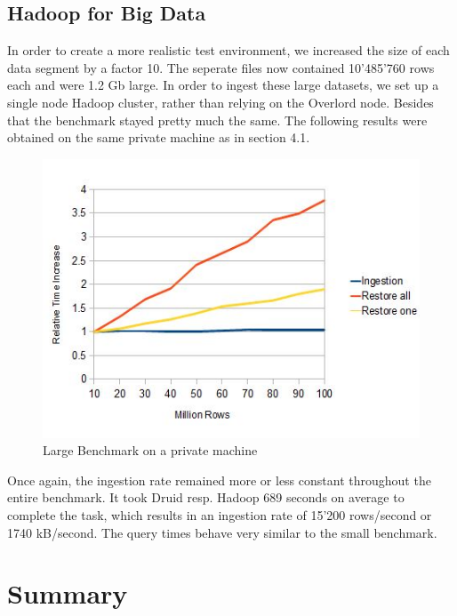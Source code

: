 \documentclass[11pt,singlecolumn]{scrartcl}
\begin{document}
\clearpage
\subsection{Hadoop for Big Data}
In order to create a more realistic test environment, we increased the size of each data segment by a factor 10. The seperate files now contained 10'485'760 rows each and were 1.2 Gb large. In order to ingest these large datasets, we set up a single node Hadoop cluster, rather than relying on the Overlord node. Besides that the benchmark stayed pretty much the same. The following results were obtained on the same private machine as in section 4.1.

\begin{figure}[h]
\includegraphics{loclarge.jpg}
\caption{Large Benchmark on a private machine}
\end{figure}

Once again, the ingestion rate remained more or less constant throughout the entire benchmark. It took Druid resp. Hadoop  689 seconds on average to complete the task, which results in an ingestion rate of 15'200 rows/second or 1740 kB/second. The query times behave very similar to the small benchmark.

\clearpage
\section{Summary}
\end{document}
